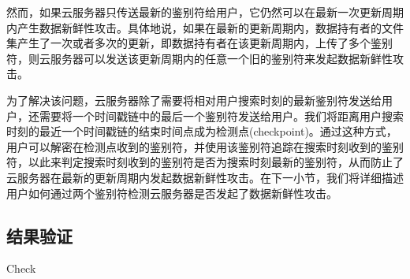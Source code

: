 然而，如果云服务器只传送最新的鉴别符给用户，它仍然可以在最新一次更新周期内产生数据新鲜性攻击。具体地说，如果在最新的更新周期内，数据持有者的文件集产生了一次或者多次的更新，即数据持有者在该更新周期内，上传了多个鉴别符，则云服务器可以发送该更新周期内的任意一个旧的鉴别符来发起数据新鲜性攻击。

为了解决该问题，云服务器除了需要将相对用户搜索时刻的最新鉴别符发送给用户，还需要将一个时间戳链中的最后一个鉴别符发送给用户。我们将距离用户搜索时刻的最近一个时间戳链的结束时间点成为检测点(checkpoint)。通过这种方式，用户可以解密在检测点收到的鉴别符，并使用该鉴别符追踪在搜索时刻收到的鉴别符，以此来判定搜索时刻收到的鉴别符是否为搜索时刻最新的鉴别符，从而防止了云服务器在最新的更新周期内发起数据新鲜性攻击。在下一小节，我们将详细描述用户如何通过两个鉴别符检测云服务器是否发起了数据新鲜性攻击。


\subsection{结果验证}

\begin{algorithm}[t]
  \caption{Check}
  \label{alg:check}
  \begin{algorithmic}[1]
              \ENDIF
              \ENDIF
                    \ENDIF
              \ENDFOR
              \ELSE
              \ENDIF
  \end{algorithmic}
\end{algorithm}

